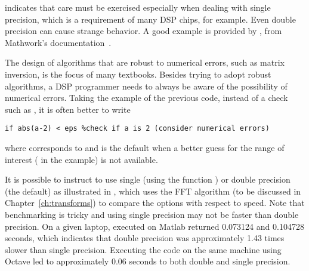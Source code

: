 indicates that care must be exercised especially when dealing with single precision, which is a requirement of many DSP chips, for example. Even double precision can cause strange behavior. A good example is provided by , from Mathwork's documentation~.


The design of algorithms that are robust to numerical errors, such as matrix inversion, is the focus of many textbooks.
Besides trying to adopt robust algorithms, a DSP programmer needs to always be aware of the possibility of numerical errors. Taking the example of the previous code, instead of a check such as , it is often better to write 
\begin{lstlisting}
if abs(a-2) < eps %check if a is 2 (consider numerical errors)
\end{lstlisting}
where  corresponds to  and is the default when a better guess for the range of interest ( in the example) is not available.

It is possible to instruct {\matlab} to use single (using the function ) or double precision (the default) as illustrated in , which uses the FFT algorithm (to be discussed in Chapter~\ref{ch:transforms}) to compare the options with respect to speed.
Note that benchmarking is tricky and using single precision may not be faster than double precision. On a given laptop, 
 executed on Matlab returned 0.073124 and 0.104728 seconds, which indicates that double precision was approximately 1.43 times slower than single precision. Executing the code on the same machine using Octave led to approximately 0.06 seconds to both double and single precision.
\eExample 
